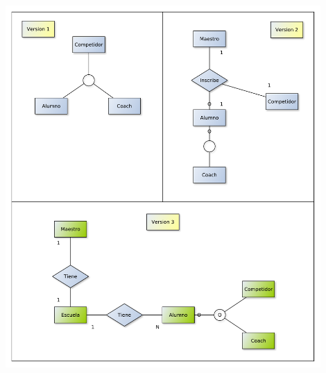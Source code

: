 \begin{center}
\includegraphics[width=12cm,keepaspectratio]{./imagenes/des3.pdf}\newline
\end{center}


